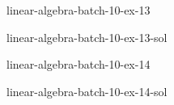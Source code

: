 \documentclass[preview]{standalone}
\begin{document}
\begin{snippetexercise}{linear-algebra-batch-10-ex-13}{}
    \todo
\end{snippetexercise}

\begin{snippetsolution}{linear-algebra-batch-10-ex-13-sol}{}
    \todo
\end{snippetsolution}

\begin{snippetexercise}{linear-algebra-batch-10-ex-14}{}
    \todo
\end{snippetexercise}

\begin{snippetsolution}{linear-algebra-batch-10-ex-14-sol}{}
    \todo
\end{snippetsolution}
\end{document}

